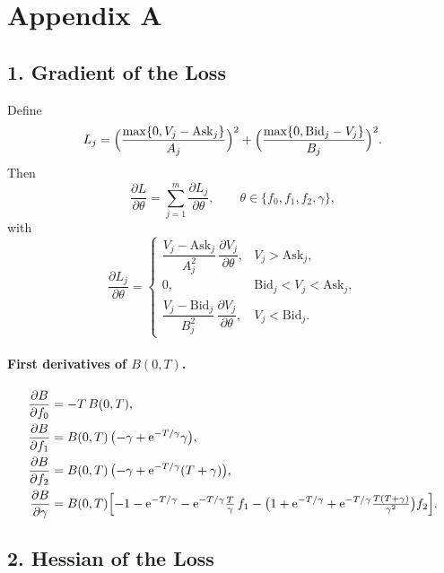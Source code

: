 \documentclass[12pt]{article}
\begin{document}
\clearpage
\section*{Appendix A}

\subsection*{1. Gradient of the Loss}

Define
\[
L_j
 = \Bigl(\frac{\max\{0,V_j-\mathrm{Ask}_j\}}{A_j}\Bigr)^{2}
 + \Bigl(\frac{\max\{0,\mathrm{Bid}_j-V_j\}}{B_j}\Bigr)^{2}.
\]
Then
\begin{equation}
\frac{\partial L}{\partial\theta}
  =\sum_{j=1}^{m}\frac{\partial L_j}{\partial\theta},
  \qquad
  \theta\in\{f_0,f_1,f_2,\gamma\},
\end{equation}
with
\[
\frac{\partial L_j}{\partial\theta}=
\begin{cases}
 \dfrac{V_j-\mathrm{Ask}_j}{A_j^{2}}\,
 \dfrac{\partial V_j}{\partial\theta},
   & V_j>\mathrm{Ask}_j,\\[0.6em]
 0, & \mathrm{Bid}_j<V_j<\mathrm{Ask}_j,\\[0.6em]
 \dfrac{V_j-\mathrm{Bid}_j}{B_j^{2}}\,
 \dfrac{\partial V_j}{\partial\theta},
   & V_j<\mathrm{Bid}_j.
\end{cases}
\]

\paragraph{First derivatives of \(B(0,T)\).}
\begin{align}
\frac{\partial B}{\partial f_0} &= -T\,B(0,T),\\
\frac{\partial B}{\partial f_1} &= B(0,T)\,\bigl(-\gamma+\mathrm{e}^{-T/\gamma}\gamma\bigr),\\
\frac{\partial B}{\partial f_2} &= B(0,T)\,\bigl(-\gamma+\mathrm{e}^{-T/\gamma}(T+\gamma)\bigr),\\
\frac{\partial B}{\partial\gamma} &=
  B(0,T)\Bigl[
    -1-\mathrm{e}^{-T/\gamma}
    -\mathrm{e}^{-T/\gamma}\tfrac{T}{\gamma}\,f_1
    -\bigl(1+\mathrm{e}^{-T/\gamma}
           +\mathrm{e}^{-T/\gamma}\tfrac{T(T+\gamma)}{\gamma^{2}}\bigr)f_2
  \Bigr].
\end{align}

\subsection*{2. Hessian of the Loss}
\end{document}
